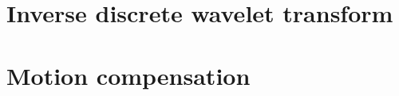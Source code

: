 


\clearpage
\section{Inverse discrete wavelet transform}

\clearpage
\section{Motion compensation}
